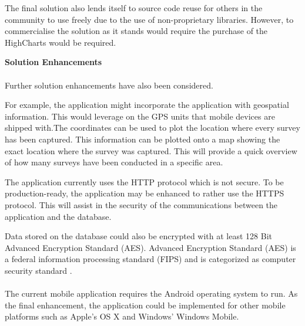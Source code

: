 \documentclass[12pt]{witseiepaper}
\begin{document}
The final solution also lends itself to source code reuse for others in the community to use freely due to the use of non-proprietary libraries. However, to commercialise the solution as it stands would require the purchase of the HighCharts would be required.

\textbf{Solution Enhancements}\\ \\
Further solution enhancements have also been considered.

For example, the application might incorporate the application with geospatial information. This would leverage on the GPS units that mobile devices are shipped with.The coordinates can be used to plot the location where every survey has been captured. This information can be plotted onto a map showing the exact location where the survey was captured. This will provide a quick overview of how many surveys have been conducted in a specific area.

The application currently uses the HTTP protocol which is not secure. To be production-ready, the application may be enhanced to rather use the HTTPS protocol. This will assist in the security of the communications between the application and the database.

Data stored on the database could also be encrypted with at least 128 Bit Advanced Encryption Standard (AES). Advanced Encryption Standard (AES) is a federal information processing standard (FIPS) and is categorized as computer security standard \cite{AES}. \\ \\
The current mobile application requires the Android operating system to run. As the final enhancement, the application could be implemented for other mobile platforms such as Apple's OS X and Windows' Windows Mobile.


\end{document}
